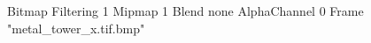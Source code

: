 {Bitmap
	{Filtering 1}
	{Mipmap 1}
	{Blend none}
	{AlphaChannel 0}
	{Frame "metal_tower_x.tif.bmp"}
}
